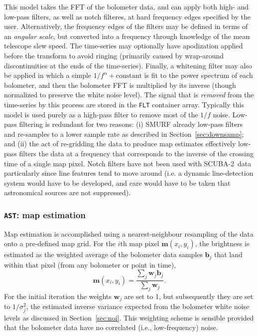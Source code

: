 \documentclass[useAMS,usenatbib,nofootinbib]{mn2e}
\newcommand{\scuba}{SCUBA-2}
\newcommand{\model}[1]{\texttt{#1}}
\begin{document}
This model takes the FFT of the bolometer data, and can apply both
high- and low-pass filters, as well as notch filteres, at hard
frequency edges specified by the user. Alternatively, the frequency
edges of the filters may be defined in terms of an \emph{angular
  scale}, but converted into a frequency through knowledge of the mean
telescope slew speed. The time-series may optionally have apodization
applied before the transform to avoid ringing (primarily caused by
wrap-around discontinuities at the ends of the time-series). Finally,
a whitening filter may also be applied in which a simple $1/f^\alpha +
\mathrm{constant}$ is fit to the power spectrum of each bolometer, and
then the bolometer FFT is multiplied by its inverse (though normalized
to preserve the white noise level).  The signal that is \emph{removed}
from the time-series by this process are stored in the \model{FLT}
container array. Typically this model is used purely as a high-pass
filter to remove most of the $1/f$ noise. Low-pass filtering is
redundant for two reasons: (i) SMURF already low-pass filters and
re-samples to a lower sample rate as described in
Section~\ref{sec:downsamp}; and (ii) the act of re-gridding the data
to produce map estimates effectively low-pass filters the data at a
frequency that corresponds to the inverse of the crossing time of a
single map pixel. Notch filters have not been used with \scuba\ data
particularly since line features tend to move around (i.e. a dynamic
line-detection system would have to be developed, and care would have
to be taken that astronomical sources are not suppressed).

\subsubsection{\model{AST}: map estimation}
\label{sec:ast}

Map estimation is accomplished using a nearest-neighbour resampling of
the data onto a pre-defined map grid. For the $i$th map pixel
$\mathbf{m}(x_i,y_i)$, the brightness is estimated as the weighted
average of the bolometer data samples $\mathbf{b}_j$ that land within
that pixel (from any bolometer or point in time),
%
\begin{equation}
  \mathbf{m}(x_i,y_i) = \frac{\sum_j \mathbf{w}_j \mathbf{b}_j }
                             { \sum_j \mathbf{w}_j } .
\end{equation}
%
For the initial iteration the weights $\mathbf{w}_j$ are set to 1, but
subsequently they are set to $1/\sigma_j^2$, the estimated inverse
variance expected from the bolometer white noise levels as discussed
in Section~\ref{sec:noi}. This weighting scheme is sensible provided
that the bolometer data have no correlated (i.e., low-frequency)
noise.
\end{document}
